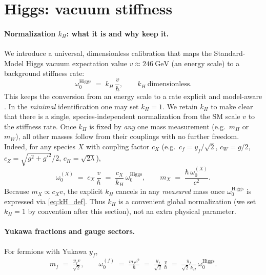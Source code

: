 \documentclass[11pt,oneside]{article}
\begin{document}
\section{Higgs: vacuum stiffness}

\paragraph{Normalization \(k_H\): what it is and why keep it.}
We introduce a universal, dimensionless calibration that maps the Standard-Model Higgs vacuum expectation value \(v\approx 246~\mathrm{GeV}\) (an energy scale) to a background stiffness rate:
\begin{equation}
\omega_0^{\mathrm{Higgs}} \;=\; k_H\,\frac{v}{\hbar},\qquad k_H\ \text{dimensionless}.
\label{eq:kH_def}
\end{equation}
This keeps the conversion from an energy scale to a rate explicit and model-aware \cite{tiesinga2021codata}. In the \emph{minimal} identification one may set \(k_H=1\). We retain \(k_H\) to make clear that there is a single, species-independent normalization from the SM scale \(v\) to the stiffness rate. Once \(k_H\) is fixed by \emph{any} one mass measurement (e.g.\ \(m_H\) or \(m_W\)), all other masses follow from their couplings with no further freedom. Indeed, for any species \(X\) with coupling factor \(c_X\) (e.g.\ \(c_f=y_f/\sqrt{2}\), \(c_W=g/2\), \(c_Z=\sqrt{g^2+g'^2}/2\), \(c_H=\sqrt{2\lambda}\)),
\begin{equation}
\omega_0^{(X)} \;=\; c_X\,\frac{v}{\hbar} \;=\; \frac{c_X}{k_H}\,\omega_0^{\mathrm{Higgs}},
\qquad
m_X \;=\; \frac{\hbar\,\omega_0^{(X)}}{c^2}.
\label{eq:species_w0_general}
\end{equation}
Because \(m_X\propto c_X v\), the explicit \(k_H\) cancels in any \emph{measured} mass once \(\omega_0^{\mathrm{Higgs}}\) is expressed via \eqref{eq:kH_def}. Thus \(k_H\) is a convenient global normalization (we set \(k_H=1\) by convention after this section), not an extra physical parameter.

\paragraph{Yukawa fractions and gauge sectors.}
For fermions with Yukawa \(y_f\),
\begin{equation}
\label{eq:w0_fermion}
\begin{aligned}
m_f \;=\; \frac{y_f v}{\sqrt{2}},\qquad
\omega_0^{(f)} \;=\; \frac{m_f c^2}{\hbar}
                 \;=\; \frac{y_f}{\sqrt{2}}\,\frac{v}{\hbar}
                 \;=\; \frac{y_f}{\sqrt{2}\,k_H}\,\omega_0^{\mathrm{Higgs}}.
\end{aligned}
\end{equation}
\end{document}
